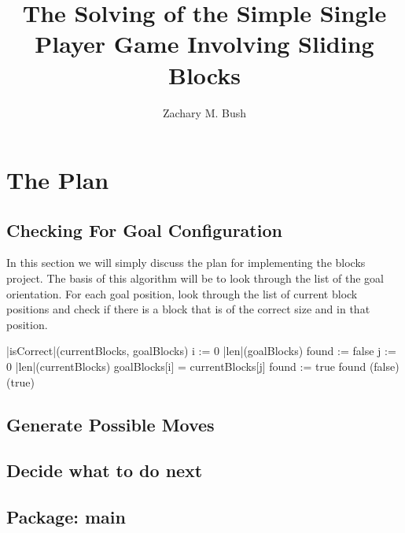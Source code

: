 \documentclass[a4paper]{article}
\newcommand{\sourceRoot}{../src/}
\newcommand{\myPackage}{}
\newcommand{\myJPackage}{}
\newcommand{\sourcePackage}[2]{\subsection*{Package: #2}\renewcommand{\myPackage}{#1}\renewcommand{\myJPackage}{#2}}
\newcommand{\sourceClass}[1]{}
\begin{document}
\title{The Solving of the Simple Single Player Game Involving Sliding Blocks}
\author{Zachary M. Bush}
\maketitle
\tableofcontents
\lstlistoflistings
\section{The Plan}
\subsection{Checking For Goal Configuration}
In this section we will simply discuss the plan for implementing the blocks project. The basis of this algorithm will be to look through the list of the goal orientation. For each goal position, look through the list of current block positions and check if there is a block that is of the correct size and in that position. 
\begin{program}
\PROC |isCorrect|(currentBlocks, goalBlocks) \BODY
\FOR i := 0 \TO |len|(goalBlocks) \DO
   found := false 
   \FOR j := 0 \TO |len|(currentBlocks) \DO
      \IF goalBlocks[i] = currentBlocks[j] \THEN found := true \FI
   \OD
   \IF \NOT found \THEN \EXIT(false) \FI {}
\OD
\EXIT(true)\ENDPROC
\end{program}
\subsection{Generate Possible Moves}

\subsection{Decide what to do next}
\sourcePackage{.}{main}
\sourceClass{Solver.java}
\sourceClass{Solver.java}
\sourceClass{Solver.java}
\sourceClass{Solver.java}
\sourceClass{Solver.java}
\end{document}
